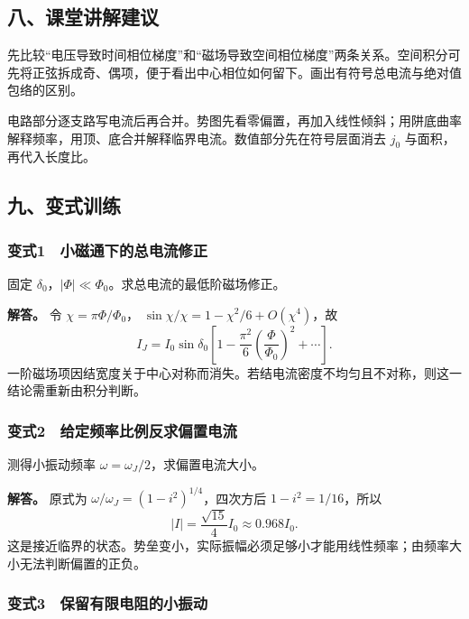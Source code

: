 \documentclass[12pt,a4paper,fontset=fandol]{ctexart}
\begin{document}
\subsection{八、课堂讲解建议}\label{ux516bux8bfeux5802ux8bb2ux89e3ux5efaux8bae-4}

先比较``电压导致时间相位梯度''和``磁场导致空间相位梯度''两条关系。空间积分可先将正弦拆成奇、偶项，便于看出中心相位如何留下。画出有符号总电流与绝对值包络的区别。

电路部分逐支路写电流后再合并。势图先看零偏置，再加入线性倾斜；用阱底曲率解释频率，用顶、底合并解释临界电流。数值部分先在符号层面消去
\(j_0\) 与面积，再代入长度比。

\subsection{九、变式训练}\label{ux4e5dux53d8ux5f0fux8badux7ec3-4}

\subsubsection{变式1　小磁通下的总电流修正}\label{ux53d8ux5f0f1-ux5c0fux78c1ux901aux4e0bux7684ux603bux7535ux6d41ux4feeux6b63}

固定 \(\delta_0\)，\(|\Phi|\ll\Phi_0\)。求总电流的最低阶磁场修正。

\textbf{解答。} 令 \(\chi=\pi\Phi/\Phi_0\)，
\(\sin\chi/\chi=1-\chi^2/6+O(\chi^4)\)，故 \[
\boxed{I_J=I_0\sin\delta_0
\left[1-\frac{\pi^2}{6}\left(\frac{\Phi}{\Phi_0}\right)^2+\cdots\right].}
\]
一阶磁场项因结宽度关于中心对称而消失。若结电流密度不均匀且不对称，则这一结论需重新由积分判断。

\subsubsection{变式2　给定频率比例反求偏置电流}\label{ux53d8ux5f0f2-ux7ed9ux5b9aux9891ux7387ux6bd4ux4f8bux53cdux6c42ux504fux7f6eux7535ux6d41}

测得小振动频率 \(\omega=\omega_J/2\)，求偏置电流大小。

\textbf{解答。} 原式为 \(\omega/\omega_J=(1-i^2)^{1/4}\)，四次方后
\(1-i^2=1/16\)，所以 \[
\boxed{|I|=\frac{\sqrt{15}}4I_0\approx0.968I_0.}
\]
这是接近临界的状态。势垒变小，实际振幅必须足够小才能用线性频率；由频率大小无法判断偏置的正负。

\subsubsection{变式3　保留有限电阻的小振动}\label{ux53d8ux5f0f3-ux4fddux7559ux6709ux9650ux7535ux963bux7684ux5c0fux632fux52a8}
\end{document}
